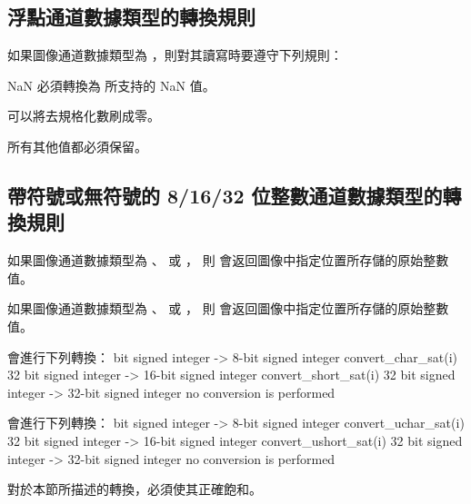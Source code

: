 \subsection{浮點通道數據類型的轉換規則}

如果圖像通道數據類型為 ，則對其讀寫時要遵守下列規則：
\startigBase
\item NaN 必須轉換為  所支持的 NaN 值。
\item 可以將去規格化數刷成零。
\item 所有其他值都必須保留。
\stopigBase

\subsection{帶符號或無符號的 8/16/32 位整數通道數據類型的轉換規則}

如果圖像通道數據類型為 、 
或 ，
則  會返回圖像中指定位置所存儲的原始整數值。

如果圖像通道數據類型為 、 
或 ，
則  會返回圖像中指定位置所存儲的原始整數值。

 會進行下列轉換：
 bit signed integer -> 8-bit signed integer
	convert_char_sat(i)
32 bit signed integer -> 16-bit signed integer
	convert_short_sat(i)
32 bit signed integer -> 32-bit signed integer
	no conversion is performed
\stopclc

 會進行下列轉換：
 bit signed integer -> 8-bit signed integer
	convert_uchar_sat(i)
32 bit signed integer -> 16-bit signed integer
	convert_ushort_sat(i)
32 bit signed integer -> 32-bit signed integer
	no conversion is performed
\stopclc

對於本節所描述的轉換，必須使其正確飽和。
